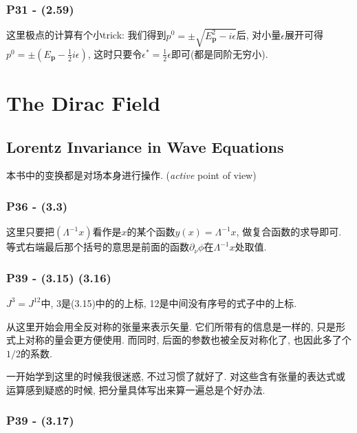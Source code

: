 \documentclass[cn,hazy,green,11pt,device=normal,chinesefont=founder]{elegantnote}
\begin{document}
\subsubsection{P31 - (2.59)}

这里极点的计算有个小trick: 我们得到$p^0 = \pm\sqrt{E_\mathbf{p}^2 - i\epsilon}$后, 对小量$\epsilon$展开可得$p^0 = \pm (E_\mathbf{p} - \frac{1}{2}i\epsilon)$, 这时只要令$\epsilon^* = \frac{1}{2}\epsilon$即可(都是同阶无穷小). 

\clearpage

\section{The Dirac Field}

\subsection{Lorentz Invariance in Wave Equations}

\begin{note}
  本书中的变换都是对场本身进行操作. (\textit{active} point of view)
\end{note}

\subsubsection{P36 - (3.3)}

这里只要把$(\Lambda^{-1}x)$看作是$x$的某个函数$y(x) = \Lambda^{-1}x$, 做复合函数的求导即可. 等式右端最后那个括号的意思是前面的函数$\partial_{\nu}\phi$在$\Lambda^{-1}x$处取值. 

\subsubsection{P39 - (3.15) (3.16)}

$J^3 = J^{12}$中, 3是(3.15)中的的上标, 12是中间没有序号的式子中的上标. 

从这里开始会用全反对称的张量来表示矢量. 它们所带有的信息是一样的, 只是形式上对称的量会更方便使用. 而同时, 后面的参数也被全反对称化了, 也因此多了个$1/2$的系数. 

\begin{remark}
  一开始学到这里的时候我很迷惑, 不过习惯了就好了. 对这些含有张量的表达式或运算感到疑惑的时候, 把分量具体写出来算一遍总是个好办法. 
\end{remark}

\subsubsection{P39 - (3.17)}
\end{document}
